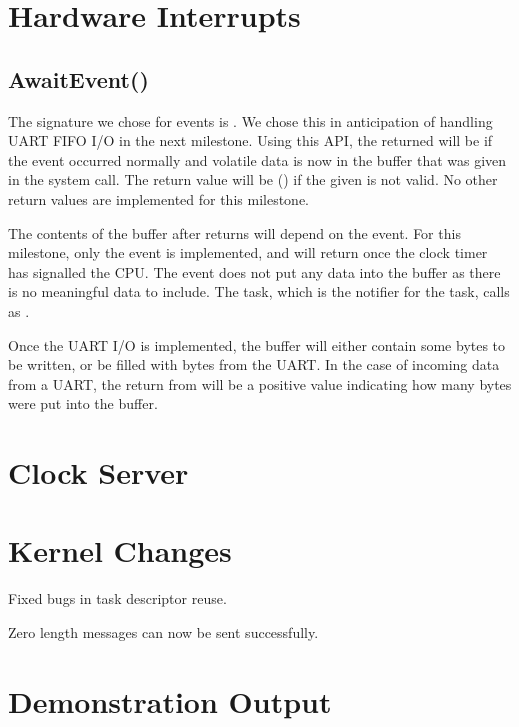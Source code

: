 \documentclass[pdftex,10pt,a4paper]{article}
\begin{document}
\newpage
\section*{Hardware Interrupts}

\subsection*{AwaitEvent()}

The signature we chose for events is
. We chose
this in anticipation of handling UART FIFO I/O in the next
milestone. Using this API, the returned  will be  if
the event occurred normally and volatile data is now in the
 buffer that was given in the system call. The return value
will be  () if the given  is
not valid. No other return values are implemented for this milestone.

The contents of the  buffer after  returns
will depend on the event. For this milestone, only the
 event is implemented, and will return once the clock
timer has signalled the CPU. The  event does not put
any data into the  buffer as there is no meaningful data to
include. The  task, which is the notifier for the
 task, calls  as
.

Once the UART I/O is implemented, the  buffer will either
contain some bytes to be written, or be filled with bytes from the
UART. In the case of incoming data from a UART, the return from
 will be a positive value indicating how many bytes
were put into the  buffer.

\section*{Clock Server}

\section*{Kernel Changes}

Fixed bugs in task descriptor reuse.

Zero length messages can now be sent successfully.

\section*{Demonstration Output}
\end{document}
